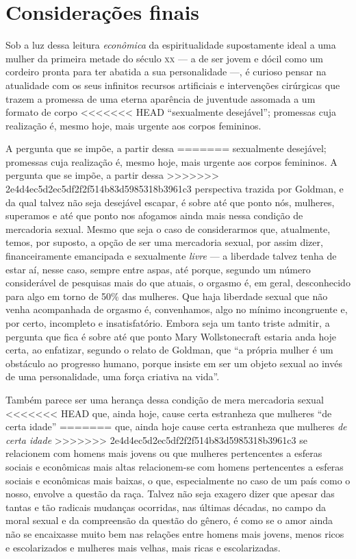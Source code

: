 \section{Considerações finais}

Sob a luz dessa leitura \textit{econômica} da espiritualidade
supostamente ideal a uma mulher da primeira metade do século \textsc{xx} --- a de
ser jovem e dócil como um cordeiro pronta para ter abatida a sua
personalidade ---, é curioso pensar na atualidade com os seus infinitos
recursos artificiais e intervenções cirúrgicas que trazem a promessa de
uma eterna aparência de juventude assomada a um formato de corpo
<<<<<<< HEAD
``sexualmente desejável''; promessas cuja realização é, mesmo hoje, mais
urgente aos corpos femininos.

A pergunta que se impõe, a partir dessa
=======
sexualmente desejável; promessas cuja realização é, mesmo hoje, mais
urgente aos corpos femininos. A pergunta que se impõe, a partir dessa
>>>>>>> 2e4d4ec5d2ec5df2f2f514b83d5985318b3961c3
perspectiva trazida por Goldman, e da qual talvez não seja desejável
escapar, é sobre até que ponto nós, mulheres, superamos e até que
ponto nos afogamos ainda mais nessa condição de mercadoria sexual. Mesmo
que seja o caso de considerarmos que, atualmente, temos, por suposto, a
opção de ser uma mercadoria sexual, por assim dizer, financeiramente
emancipada e sexualmente \textit{livre} --- a liberdade talvez tenha de estar
aí, nesse caso, sempre entre aspas, até porque, segundo um número
considerável de pesquisas mais do que atuais, o orgasmo é, em geral,
desconhecido para algo em torno de 50\% das mulheres. Que haja liberdade
sexual que não venha acompanhada de orgasmo é, convenhamos, algo no
mínimo incongruente e, por certo, incompleto e insatisfatório. Embora
seja um tanto triste admitir, a pergunta que fica é sobre até que
ponto Mary Wollstonecraft estaria anda hoje certa, ao enfatizar, segundo
o relato de Goldman, que ``a própria mulher é um obstáculo ao progresso
humano, porque insiste em ser um objeto sexual ao invés de uma
personalidade, uma força criativa na vida''.

Também parece ser uma herança dessa condição de mera mercadoria sexual
<<<<<<< HEAD
que, ainda hoje, cause certa estranheza que mulheres ``de certa idade''
=======
que, ainda hoje cause certa estranheza que mulheres \textit{de certa idade}
>>>>>>> 2e4d4ec5d2ec5df2f2f514b83d5985318b3961c3
se relacionem com homens mais jovens ou que mulheres pertencentes a
esferas sociais e econômicas mais altas relacionem-se com homens
pertencentes a esferas sociais e econômicas mais baixas, o que,
especialmente no caso de um país como o nosso, envolve a questão da
raça. Talvez não seja exagero dizer que apesar das tantas e tão radicais
mudanças ocorridas, nas últimas décadas, no campo da moral sexual e da
compreensão da questão do gênero, é como se o amor ainda não se
encaixasse muito bem nas relações entre homens mais jovens, menos ricos
e escolarizados e mulheres mais velhas, mais ricas e escolarizadas.

